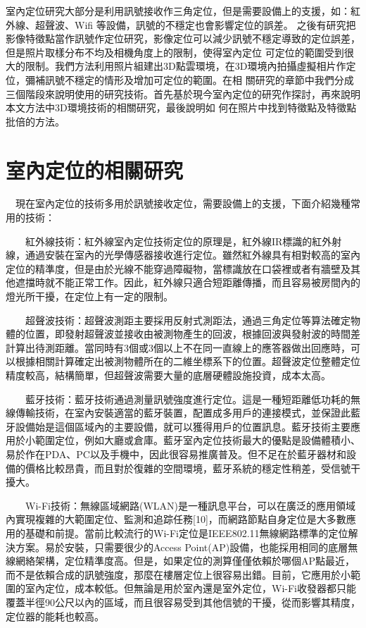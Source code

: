 
	室內定位研究大部分是利用訊號接收作三角定位，但是需要設備上的支援，如：紅外線、超聲波、Wifi 等設備，訊號的不穩定也會影響定位的誤差。
之後有研究把影像特徵點當作訊號作定位研究，影像定位可以減少訊號不穩定導致的定位誤差，但是照片取樣分布不均及相機角度上的限制，使得室內定位
可定位的範圍受到很大的限制。我們方法利用照片組建出3D點雲環境，在3D環境內拍攝虛擬相片作定位，彌補訊號不穩定的情形及增加可定位的範圍。在相
關研究的章節中我們分成三個階段來說明使用的研究技術。首先基於現今室內定位的研究作探討，再來說明本文方法中3D環境技術的相關研究，最後說明如
何在照片中找到特徵點及特徵點批倍的方法。

\section{室內定位的相關研究}

	　現在室內定位的技術多用於訊號接收定位，需要設備上的支援，下面介紹幾種常用的技術：

　　紅外線技術：紅外線室內定位技術定位的原理是，紅外線IR標識的紅外射線，通過安裝在室內的光學傳感器接收進行定位。雖然紅外線具有相對較高的室內定位的精準度，但是由於光線不能穿過障礙物，當標識放在口袋裡或者有牆壁及其他遮擋時就不能正常工作。因此，紅外線只適合短距離傳播，而且容易被房間內的燈光所干擾，在定位上有一定的限制。

　　超聲波技術：超聲波測距主要採用反射式測距法，通過三角定位等算法確定物體的位置，即發射超聲波並接收由被測物產生的回波，根據回波與發射波的時間差計算出待測距離。當同時有3個或3個以上不在同一直線上的應答器做出回應時，可以根據相關計算確定出被測物體所在的二維坐標系下的位置。超聲波定位整體定位精度較高，結構簡單，但超聲波需要大量的底層硬體設施投資，成本太高。

　　藍牙技術：藍牙技術通過測量訊號強度進行定位。這是一種短距離低功耗的無線傳輸技術，在室內安裝適當的藍牙裝置，配置成多用戶的連接模式，並保證此藍牙設備始是這個區域內的主要設備，就可以獲得用戶的位置訊息。藍牙技術主要應用於小範圍定位，例如大廳或倉庫。藍牙室內定位技術最大的優點是設備體積小、易於作在PDA、PC以及手機中，因此很容易推廣普及。但不足在於藍牙器材和設備的價格比較昂貴，而且對於復雜的空間環境，藍牙系統的穩定性稍差，受信號干擾大。

　　Wi-Fi技術：無線區域網路(WLAN)是一種訊息平台，可以在廣泛的應用領域內實現複雜的大範圍定位、監測和追踪任務[10]，而網路節點自身定位是大多數應用的基礎和前提。當前比較流行的Wi-Fi定位是IEEE802.11無線網路標準的定位解決方案。易於安裝，只需要很少的Access Point(AP)設備，也能採用相同的底層無線網絡架構，定位精準度高。但是，如果定位的測算僅僅依賴於哪個AP點最近，而不是依賴合成的訊號強度，那麼在樓層定位上很容易出錯。目前，它應用於小範圍的室內定位，成本較低。但無論是用於室內還是室外定位，Wi-Fi收發器都只能覆蓋半徑90公尺以內的區域，而且很容易受到其他信號的干擾，從而影響其精度，定位器的能耗也較高。

